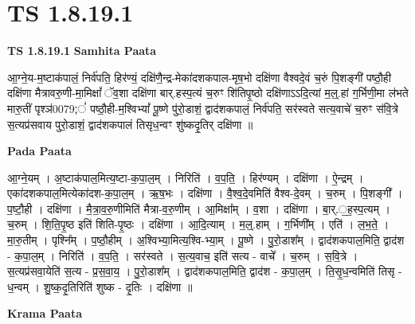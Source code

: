 \documentclass[17pt]{extarticle}
\begin{document}
\section{ TS 1.8.19.1 }

\textbf{TS 1.8.19.1 } \newline
\textbf{Samhita Paata} \newline

आ॒ग्ने॒य-म॒ष्टाक॑पालं॒ निर्व॑पति॒ हिर॑ण्यं॒ दक्षि॑णै॒न्द्र-मेका॑दशकपाल-मृष॒भो दक्षि॑णा वैश्वदे॒वं च॒रुं पि॒शङ्गी॑ पष्ठौ॒ही दक्षि॑णा मैत्रावरु॒णी-मा॒मिक्षां᳚ ॅव॒शा दक्षि॑णा बार्.हस्प॒त्यं च॒रुꣳ शि॑तिपृ॒ष्ठो दक्षि॑णाऽऽदि॒त्यां म॒ल्॒.हां ग॒र्भिणी॒मा ल॑भते मारु॒तीं पृश्ञ॑0079;ं॑ पष्ठौ॒ही-म॒श्विभ्यां᳚ पू॒ष्णे पु॑रो॒डाशं॒ द्वाद॑शकपालं॒ निर्व॑पति॒ सर॑स्वते सत्य॒वाचे॑ च॒रुꣳ स॑वि॒त्रे स॒त्यप्र॑सवाय पुरो॒डाशं॒ द्वाद॑शकपालं तिसृध॒न्वꣳ शु॑ष्कदृ॒तिर् दक्षि॑णा ॥ \newline

\textbf{Pada Paata} \newline

आ॒ग्ने॒यम् । अ॒ष्टाक॑पाल॒मित्य॒ष्टा-क॒पा॒ल॒म् । निरिति॑ । व॒प॒ति॒ । हिर॑ण्यम् । दक्षि॑णा । ऐ॒न्द्रम् । एका॑दशकपाल॒मित्येका॑दश-क॒पा॒ल॒म् । ऋ॒ष॒भः । दक्षि॑णा । वै॒श्व॒दे॒वमिति॑ वैश्व-दे॒वम् । च॒रुम् । पि॒शङ्गी᳚ । प॒ष्टौ॒ही । दक्षि॑णा । मै॒त्रा॒व॒रु॒णीमिति॑ मैत्रा-व॒रु॒णीम् । आ॒मिक्षा᳚म् । व॒शा । दक्षि॑णा । बा॒र्.॒ह॒स्प॒त्यम् । च॒रुम् । शि॒ति॒पृ॒ष्ठ इति॑ शिति-पृ॒ष्ठः । दक्षि॑णा । आ॒दि॒त्याम् । म॒ल्॒.हाम् । ग॒र्भिणी᳚म् । एति॑ । ल॒भ॒ते॒ । मा॒रु॒तीम् । पृश्नि᳚म् । प॒ष्ठौ॒हीम् । अ॒श्विभ्या॒मित्य॒श्वि-भ्या॒म् । पू॒ष्णे । पु॒रो॒डाश᳚म् । द्वाद॑शकपाल॒मिति॒ द्वाद॑श - क॒पा॒ल॒म् । निरिति॑ । व॒प॒ति॒ । सर॑स्वते । स॒त्य॒वाच॒ इति॑ सत्य - वाचे᳚ । च॒रुम् । स॒वि॒त्रे । स॒त्यप्र॑सवा॒येति॑ स॒त्य - प्र॒स॒वा॒य॒ । पु॒रो॒डाश᳚म् । द्वाद॑शकपाल॒मिति॒ द्वाद॑श - क॒पा॒ल॒म् । ति॒सृ॒ध॒न्वमिति॑ तिसृ - ध॒न्वम् । शु॒ष्क॒दृ॒तिरिति॑ शुष्क - दृ॒तिः । दक्षि॑णा ॥  \newline


\textbf{Krama Paata} \newline
\end{document}
